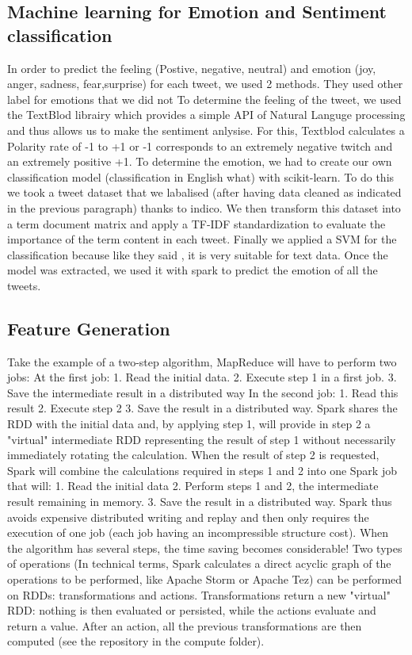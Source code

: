 \documentclass{acmtog} %
\begin{document}
\subsection{Machine learning for Emotion and Sentiment classification}
\label{subsub:ml}

In order to predict the feeling (Postive, negative, neutral) and emotion (joy, anger, sadness, fear,surprise) for each tweet, we used 2 methods. They used other label for emotions that we did not 
To determine the feeling of the tweet, we used the TextBlod librairy which provides a simple API of Natural Languge processing and thus allows us to make the sentiment anlysise. For this, Textblod calculates a Polarity rate of -1 to +1 or -1 corresponds to an extremely negative twitch and an extremely positive +1.
To determine the emotion, we had to create our own classification model (classification in English what) with scikit-learn.
To do this we took a tweet dataset that we labalised (after having data cleaned as indicated in the previous paragraph) thanks to indico.
We then transform this dataset into a term document matrix and apply a TF-IDF standardization to evaluate the importance of the term content in each tweet.
Finally we applied a SVM for the classification because like they said \cite{Medhat14}, it is very suitable for text data.
Once the model was extracted, we used it with spark to predict the emotion of all the tweets.

\subsection{Feature Generation}
\label{subsub:featureGeneration}

Take the example of a two-step algorithm, MapReduce will have to perform two jobs:
At the first job:
1.	Read the initial data.
2.	Execute step 1 in a first job.
3.	Save the intermediate result in a distributed way
In the second job:
1.	Read this result
2.	Execute step 2
3.	Save the result in a distributed way.
Spark shares the RDD with the initial data and, by applying step 1, will provide in step 2 a "virtual" intermediate RDD representing the result of step 1 without necessarily immediately rotating the calculation. When the result of step 2 is requested, Spark will combine the calculations required in steps 1 and 2 into one Spark job that will:
1.	Read the initial data
2.	Perform steps 1 and 2, the intermediate result remaining in memory.
3.	Save the result in a distributed way.
Spark thus avoids expensive distributed writing and replay and then only requires the execution of one job (each job having an incompressible structure cost).
When the algorithm has several steps, the time saving becomes considerable!
Two types of operations (In technical terms, Spark calculates a direct acyclic graph of the operations to be performed, like Apache Storm or Apache Tez) can be performed on RDDs: transformations and actions. Transformations return a new "virtual" RDD: nothing is then evaluated or persisted, while the actions evaluate and return a value. After an action, all the previous transformations are then computed (see the repository in the compute folder).
\end{document}
